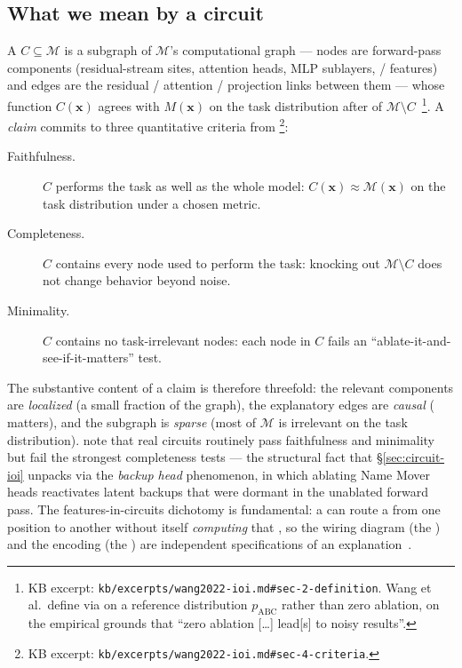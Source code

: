 \subsection{What we mean by a circuit}
\label{sec:substrate-circuit}

A \textbf{} $C \subseteq \mathcal{M}$ is a subgraph of
$\mathcal{M}$'s computational graph --- nodes are forward-pass
components (residual-stream sites, attention heads, MLP sublayers,
/ features) and edges are the residual / attention /
projection links between them --- whose function $C(\mathbf{x})$
agrees with $M(\mathbf{x})$ on the task distribution after \emph{}
of $\mathcal{M} \setminus C$~\citep[\S 2]{wang2022-ioi}\footnote{KB
excerpt: \nolinkurl{kb/excerpts/wang2022-ioi.md#sec-2-definition}. Wang
et al.\ define  via  on a reference distribution
$p_{\mathrm{ABC}}$ rather than zero ablation, on the empirical
grounds that ``zero ablation [\ldots] lead[s] to noisy results''.}.
A  \emph{claim} commits to three quantitative criteria from
\citet[\S 4]{wang2022-ioi}\footnote{KB excerpt:
\nolinkurl{kb/excerpts/wang2022-ioi.md#sec-4-criteria}.}:
\begin{description}
  \item[Faithfulness.] $C$ performs the task as well as the whole
    model: $C(\mathbf{x}) \approx \mathcal{M}(\mathbf{x})$ on the task
    distribution under a chosen metric.
  \item[Completeness.] $C$ contains every node used to perform the
    task: knocking out $\mathcal{M} \setminus C$ does not change
    behavior beyond noise.
  \item[Minimality.] $C$ contains no task-irrelevant nodes: each
    node in $C$ fails an ``ablate-it-and-see-if-it-matters'' test.
\end{description}
The substantive content of a  claim is therefore threefold:
the relevant components are \emph{localized} (a small fraction of the
graph), the explanatory edges are \emph{causal} ( matters),
and the subgraph is \emph{sparse} (most of $\mathcal{M}$ is
irrelevant on the task distribution). \citet{wang2022-ioi} note that
real circuits routinely pass faithfulness and minimality but fail the
strongest completeness tests --- the structural fact that
\S\ref{sec:circuit-ioi} unpacks via the \emph{backup head}
phenomenon, in which ablating Name Mover heads reactivates latent
backups that were dormant in the unablated forward pass. The
features-in-circuits dichotomy is fundamental: a  can route a
 from one position to another without itself \emph{computing}
that , so the wiring diagram (the ) and the encoding
(the ) are independent specifications of an
explanation~\citep[\S 2.1]{wang2022-ioi}.

